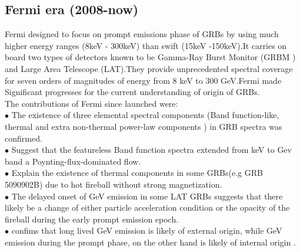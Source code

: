 \subsection{Fermi era (2008-now)}
 Fermi designed to focus on prompt emissions phase of GRBs by using  much higher energy ranges (8keV - 300keV) than swift (15keV -150keV).It carries on board two types of detectors known to be  Gamma-Ray Burst Monitor (GRBM ) and Large Area Telescope (LAT).They provide unprecedented spectral coverage for seven orders of magnitudes of energy from 8 keV to 300 GeV.Fermi made Significant progresses for the current understanding of origin of GRBs.\\ 	The contributions of Fermi since launched were:\\
$\bullet$ The existence of three elemental spectral components (Band function-like, thermal and extra non-thermal power-law components ) in GRB spectra was confirmed.\\
$\bullet$ Suggest that the featureless Band function spectra extended from keV to Gev
band a Poynting-flux-dominated flow.\\
$\bullet$ Explain the existence of thermal components in some GRBs(e.g GRB 5090902B)
due to hot fireball without strong magnetization.\\
$\bullet$ The delayed onset of GeV emission in some LAT GRBs suggests that there likely be a change of either particle acceleration condition or the opacity of the fireball during the early prompt emission epoch.\\
$\bullet$ confims that long lived GeV emission is likely of external origin, while GeV emission during the prompt phase, on the other hand is likely of internal origin \citep{10} \citep{11}.
